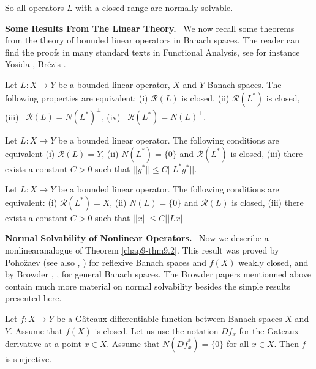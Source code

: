 So all operators $L$ with a closed range are normally solvable.

\medskip
\noindent
{\bf Some Results From The Linear Theory.}~ We now recall some
theorems from the theory of bounded linear operators in Banach
spaces. The reader can find the proofs in many standard texts in
Functional Analysis, see for instance Yosida \cite{key79}, Br\'ezis
\cite{key15}. 

\begin{theorem}\label{chap9-thm9.1}
Let $L:X\to Y$ be a bounded linear operator, $X$ and $Y$ Banach
spaces. The following properties are equivalent: {\rm(i)}
$\mathcal{R}(L)$ is closed, {\rm(ii)} $\mathcal{R}(L^{*})$ is closed,
{\rm(iii)}~ $\mathcal{R}(L)=N(L^{*})^{\perp}$, {\rm(iv)}~
$\mathcal{R}(L^*)=N(L)^{\perp}$. 
\end{theorem}


\begin{theorem}\label{chap9-thm9.2}
Let $L:X\to Y$ be a bounded linear operator. The following conditions
are equivalent {\rm(i)} $\mathcal{R}(L)=Y$, {\rm(ii)} $N(L^{*})=\{0\}$
and $\mathcal{R}(L^{*})$ is closed, {\rm(iii)} there exists a constant
$C>0$ such that $||y^{*}||\leq C||L^{*}y^{*}||$. 
\end{theorem}


\begin{theorem}\label{chap9-thm9.3}
Let $L:X\to Y$ be a bounded linear operator. The following conditions
are equivalent: {\rm(i)} $\mathcal{R}(L^{*})=X$, {\rm(ii)}
$N(L)=\{0\}$ and $\mathcal{R}(L)$ is closed, {\rm(iii)} there exists a
constant $C>0$ such that $||x||\leq C||Lx||$
\end{theorem}

\medskip
\noindent
{\bf Normal Solvability of Nonlinear Operators.}~ Now we describe a
nonlinear\pageoriginale analogue of Theorem \ref{chap9-thm9.2}. 
This result was proved by Poho\u{z}aev \cite{key63} (see also
\cite{key64}, \cite{key65}) for reflexive Banach spaces and $f(X)$
weakly closed, and by Browder \cite{key20}, \cite{key21}, for general
Banach spaces. The Browder papers mentionned above contain much more
material on normal solvability besides the simple results presented
here.

\begin{theorem}\label{chap9-thm9.4}
Let $f:X\to Y$ be a G\^ateaux differentiable function between Banach
spaces $X$ and $Y$. Assume that $f(X)$ is closed. Let us use the
notation $Df_{x}$ for the Gateaux derivative at a point $x\in
X$. Assume that $N(Df^{*}_{x})=\{0\}$ for all $x\in X$. Then $f$ is
surjective. 
\end{theorem}

